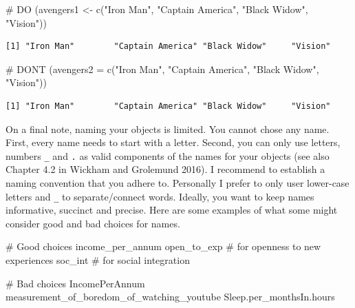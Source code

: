 \documentclass[
  letterpaper,
]{krantz}
\makeatletter
\newenvironment{Shaded}{\begin{snugshade}}{\end{snugshade}}
\newcommand{\AttributeTok}[1]{\textcolor[rgb]{0.40,0.45,0.13}{#1}}
\newcommand{\CommentTok}[1]{\textcolor[rgb]{0.37,0.37,0.37}{#1}}
\newcommand{\FunctionTok}[1]{\textcolor[rgb]{0.28,0.35,0.67}{#1}}
\newcommand{\NormalTok}[1]{\textcolor[rgb]{0.00,0.23,0.31}{#1}}
\newcommand{\OtherTok}[1]{\textcolor[rgb]{0.00,0.23,0.31}{#1}}
\newcommand{\StringTok}[1]{\textcolor[rgb]{0.13,0.47,0.30}{#1}}
\newenvironment{kframe}{%
\medskip{}
\setlength{\fboxsep}{.8em}
 \def\at@end@of@kframe{}%
 \ifinner\ifhmode%
  \def\at@end@of@kframe{\end{minipage}}%
  \begin{minipage}{\columnwidth}%
 \fi\fi%
 \def\FrameCommand##1{\hskip\@totalleftmargin \hskip-\fboxsep
 \colorbox{shadecolor}{##1}\hskip-\fboxsep
     \hskip-\linewidth \hskip-\@totalleftmargin \hskip\columnwidth}%
 \MakeFramed {\advance\hsize-\width
   \@totalleftmargin\z@ \linewidth\hsize
   \@setminipage}}%
 {\par\unskip\endMakeFramed%
 \at@end@of@kframe}
\renewenvironment{Shaded}{\begin{kframe}}{\end{kframe}}
\makeatother
\begin{document}
\begin{Shaded}
\begin{Highlighting}[]
\CommentTok{\# DO}
\NormalTok{(avengers1 }\OtherTok{\textless{}{-}} \FunctionTok{c}\NormalTok{(}\StringTok{"Iron Man"}\NormalTok{,}
                \StringTok{"Captain America"}\NormalTok{,}
                \StringTok{"Black Widow"}\NormalTok{,}
                \StringTok{"Vision"}\NormalTok{))}
\end{Highlighting}
\end{Shaded}

\begin{verbatim}
[1] "Iron Man"        "Captain America" "Black Widow"     "Vision"         
\end{verbatim}

\begin{Shaded}
\begin{Highlighting}[]
\CommentTok{\# DON\textquotesingle{}T}
\NormalTok{(}\AttributeTok{avengers2 =} \FunctionTok{c}\NormalTok{(}\StringTok{"Iron Man"}\NormalTok{,}
               \StringTok{"Captain America"}\NormalTok{,}
               \StringTok{"Black Widow"}\NormalTok{,}
               \StringTok{"Vision"}\NormalTok{))}
\end{Highlighting}
\end{Shaded}

\begin{verbatim}
[1] "Iron Man"        "Captain America" "Black Widow"     "Vision"         
\end{verbatim}

On a final note, naming your objects is limited. You cannot chose any
name. First, every name needs to start with a letter. Second, you can
only use letters, numbers \texttt{\_} and \texttt{.} as valid components
of the names for your objects (see also Chapter 4.2 in Wickham and
Grolemund 2016). I recommend to establish a naming convention that you
adhere to. Personally I prefer to only user lower-case letters and
\texttt{\_} to separate/connect words. Ideally, you want to keep names
informative, succinct and precise. Here are some examples of what some
might consider good and bad choices for names.

\begin{Shaded}
\begin{Highlighting}[]
\CommentTok{\# Good choices}
\NormalTok{income\_per\_annum}
\NormalTok{open\_to\_exp          }\CommentTok{\# for \textquotesingle{}openness to new experiences\textquotesingle{}}
\NormalTok{soc\_int              }\CommentTok{\# for \textquotesingle{}social integration\textquotesingle{}}
 
\CommentTok{\# Bad choices}
\NormalTok{IncomePerAnnum}
\NormalTok{measurement\_of\_boredom\_of\_watching\_youtube}
\NormalTok{Sleep.per\_monthsIn.hours}
\end{Highlighting}
\end{Shaded}
\end{document}

